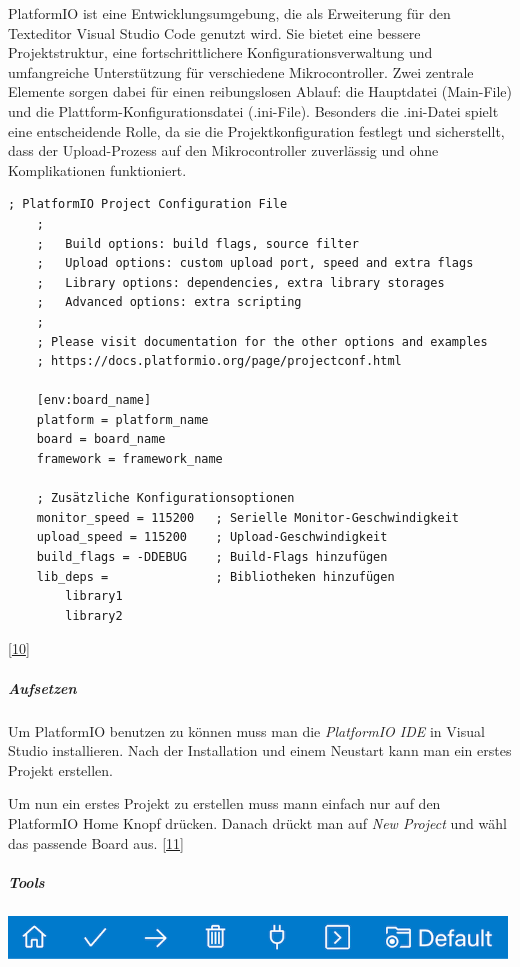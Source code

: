 \documentclass[
    headings=optiontotocandhead,%
    twoside,
    numbers=noenddot,%
    12pt, %
    titlepage, %
    parskip=full, %
    listof=leveldown, 
    numbers=noenddot, %
    a4paper,DIV=14,
    BCOR=15mm,
]{scrbook}
\let\origfigure=\figure
\let\endorigfigure=\endfigure
\renewenvironment{figure}[1][]{%
   \origfigure[H]
}{%
   \endorigfigure
}
\begin{document}
PlatformIO ist eine Entwicklungsumgebung, die als Erweiterung für den
Texteditor Visual Studio Code genutzt wird. Sie bietet eine bessere
Projektstruktur, eine fortschrittlichere Konfigurationsverwaltung und
umfangreiche Unterstützung für verschiedene Mikrocontroller. Zwei
zentrale Elemente sorgen dabei für einen reibungslosen Ablauf: die
Hauptdatei (Main-File) und die Plattform-Konfigurationsdatei
(.ini-File). Besonders die .ini-Datei spielt eine entscheidende Rolle,
da sie die Projektkonfiguration festlegt und sicherstellt, dass der
Upload-Prozess auf den Mikrocontroller zuverlässig und ohne
Komplikationen funktioniert.

\begin{lstlisting}[caption={Beispiel einer .ini Datei für ein PlatformIO Projekt}]
    ; PlatformIO Project Configuration File
    ;
    ;   Build options: build flags, source filter
    ;   Upload options: custom upload port, speed and extra flags
    ;   Library options: dependencies, extra library storages
    ;   Advanced options: extra scripting
    ;
    ; Please visit documentation for the other options and examples
    ; https://docs.platformio.org/page/projectconf.html

    [env:board_name]
    platform = platform_name
    board = board_name
    framework = framework_name

    ; Zusätzliche Konfigurationsoptionen
    monitor_speed = 115200   ; Serielle Monitor-Geschwindigkeit
    upload_speed = 115200    ; Upload-Geschwindigkeit
    build_flags = -DDEBUG    ; Build-Flags hinzufügen
    lib_deps =               ; Bibliotheken hinzufügen
        library1
        library2
\end{lstlisting}

{[}\protect\hyperlink{ref-gpt-inifile}{10}{]}

\hypertarget{aufsetzen}{%
\subparagraph{Aufsetzen}\label{aufsetzen}}

Um PlatformIO benutzen zu können muss man die \emph{PlatformIO IDE} in
Visual Studio installieren. Nach der Installation und einem Neustart
kann man ein erstes Projekt erstellen.

Um nun ein erstes Projekt zu erstellen muss mann einfach nur auf den
PlatformIO Home Knopf drücken. Danach drückt man auf \emph{New Project}
und wähl das passende Board aus.
{[}\protect\hyperlink{ref-PlatformIO-firststeps}{11}{]}

\hypertarget{tools}{%
\subparagraph{Tools}\label{tools}}

\begin{figure}
\centering
\includegraphics[width=5.20833in,height=\textheight]{img/Kampl/platformio-ide-vscode-toolbar.png}
\caption{Toolbar von PlatformIO
{[}\protect\hyperlink{ref-PlatformIO-firststeps}{11}{]}}
\end{figure}
\end{document}
